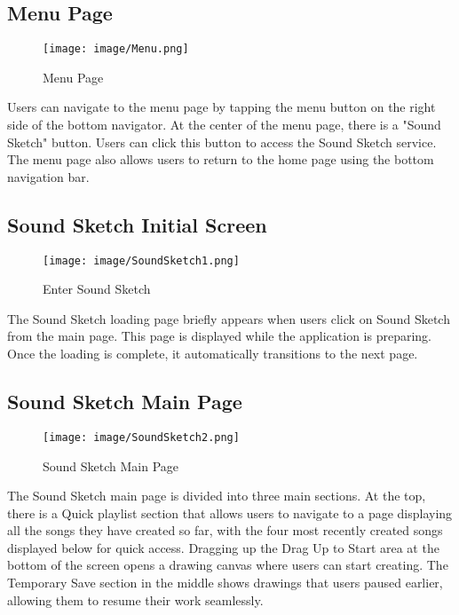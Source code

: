 \documentclass[conference]{IEEEtran}
\begin{document}
\vspace{3cm}

\subsection{Menu Page}
\begin{figure}
    \centering
    \texttt{[image: image/Menu.png]}
    \caption{Menu Page}
    \label{fig:enter-label}
\end{figure}

\noindent Users can navigate to the menu page by tapping the menu button on the right side of the bottom navigator. At the center of the menu page, there is a "Sound Sketch" button.
Users can click this button to access the Sound Sketch service. The menu page also allows users to return to the home page using the bottom navigation bar.\\

\clearpage

\subsection{Sound Sketch Initial Screen}
\begin{figure}[h!]
    \centering
    \texttt{[image: image/SoundSketch1.png]}
    \caption{Enter Sound Sketch}
    \label{fig:enter-label}
\end{figure}

\noindent The Sound Sketch loading page briefly appears when users click on Sound Sketch from the main page. This page is displayed while the application is preparing. Once the loading is complete, it automatically transitions to the next page.\\


\subsection{Sound Sketch Main Page}
\begin{figure}[h!]
    \centering
    \texttt{[image: image/SoundSketch2.png]}
    \caption{Sound Sketch Main Page }
    \label{fig:enter-label}
\end{figure}

\noindent The Sound Sketch main page is divided into three main sections. At the top, there is a Quick playlist section that allows users to navigate to a page displaying all the songs they have created so far, with the four most recently created songs displayed below for quick access. Dragging up the Drag Up to Start area at the bottom of the screen opens a drawing canvas where users can start creating. The Temporary Save section in the middle shows drawings that users paused earlier, allowing them to resume their work seamlessly.\\
\end{document}
